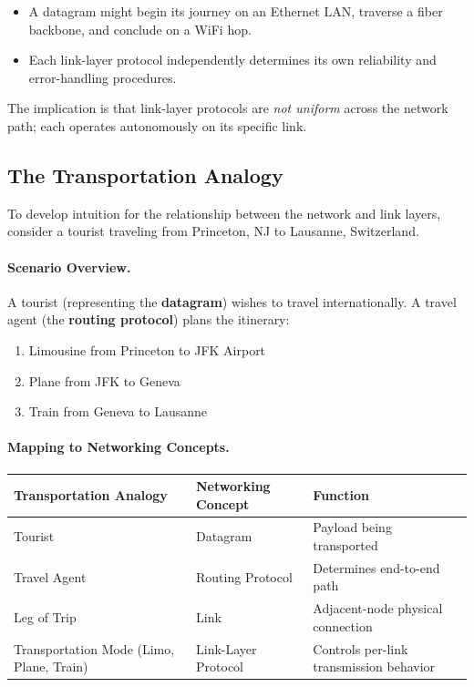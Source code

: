 \documentclass[12pt]{article}
\begin{document}
\begin{itemize}
    \item A datagram might begin its journey on an Ethernet LAN, traverse a fiber backbone, and conclude on a WiFi hop.
    \item Each link-layer protocol independently determines its own reliability and error-handling procedures.
\end{itemize}

\noindent The implication is that link-layer protocols are \emph{not uniform} across the network path; each operates autonomously on its specific link.

\subsection{The Transportation Analogy}

To develop intuition for the relationship between the network and link layers, consider a tourist traveling from Princeton, NJ to Lausanne, Switzerland.

\paragraph{Scenario Overview.}
A tourist (representing the \textbf{datagram}) wishes to travel internationally. A travel agent (the \textbf{routing protocol}) plans the itinerary:

\begin{enumerate}
    \item Limousine from Princeton to JFK Airport
    \item Plane from JFK to Geneva
    \item Train from Geneva to Lausanne
\end{enumerate}

\paragraph{Mapping to Networking Concepts.}

\begin{center}
    \begin{tabular}{|l|l|p{7cm}|}
        \hline
        \textbf{Transportation Analogy}          & \textbf{Networking Concept} & \textbf{Function}                       \\ \hline
        Tourist                                  & Datagram                    & Payload being transported               \\ \hline
        Travel Agent                             & Routing Protocol            & Determines end-to-end path              \\ \hline
        Leg of Trip                              & Link                        & Adjacent-node physical connection       \\ \hline
        Transportation Mode (Limo, Plane, Train) & Link-Layer Protocol         & Controls per-link transmission behavior \\ \hline
    \end{tabular}
\end{center}
\end{document}
